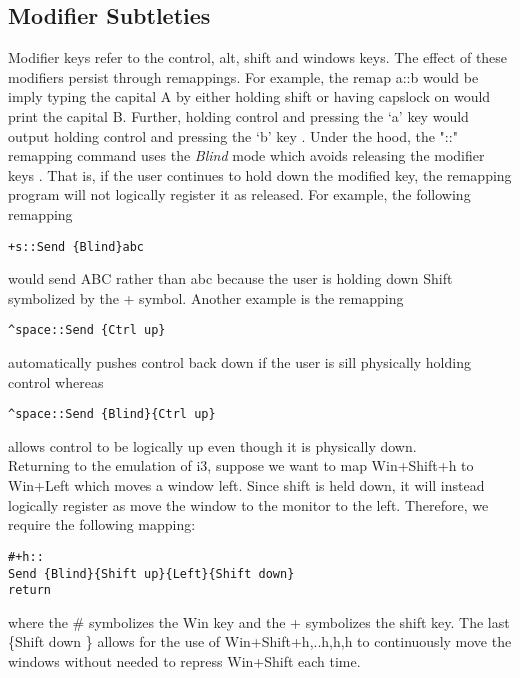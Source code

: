 \subsection{Modifier Subtleties} \label{SecModifierSubtleties}
Modifier keys refer to the control, alt, shift and windows keys.  The effect of
these modifiers persist through remappings. For example, the remap a::b would be
imply typing the capital A by either holding shift or having capslock on would
print the capital B. Further, holding control and pressing the `a' key would
output holding control and pressing the `b' key \cite{autohotkeys2005remap}.
Under the hood, the "::" remapping command uses the \emph{Blind} mode which
avoids releasing the modifier keys \cite{autohotkeys2005send}. That is, if the
user continues to hold down the modified key, the remapping program will not
logically register it as released. For example, the following remapping
\begin{lstlisting}
+s::Send {Blind}abc
\end{lstlisting}
would send ABC rather than abc because the user is holding down Shift symbolized
by the + symbol. Another example is the remapping
\begin{lstlisting}
^space::Send {Ctrl up}
\end{lstlisting}
automatically pushes control back down if the user is sill physically holding
control whereas
\begin{lstlisting}
^space::Send {Blind}{Ctrl up}
\end{lstlisting}
allows control to be logically up even though it is physically down.\\

Returning to the emulation of i3, suppose we want to map Win+Shift+h to Win+Left
which moves a window left. Since shift is held down, it will instead logically
register as move the window to the monitor to the left. Therefore, we require
the following mapping:
\begin{lstlisting}
#+h::
Send {Blind}{Shift up}{Left}{Shift down}
return
\end{lstlisting}
where the \# symbolizes the Win key and the + symbolizes the shift key. The last
\{Shift down \} allows for the use of Win+Shift+h,..h,h,h to continuously move
the windows without needed to repress Win+Shift each time.

